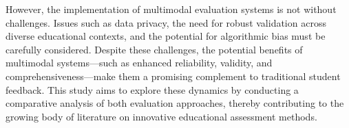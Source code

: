 However, the implementation of multimodal evaluation systems is not without challenges. Issues such as data privacy, the need for robust validation across diverse educational contexts, and the potential for algorithmic bias must be carefully considered. Despite these challenges, the potential benefits of multimodal systems—such as enhanced reliability, validity, and comprehensiveness—make them a promising complement to traditional student feedback. This study aims to explore these dynamics by conducting a comparative analysis of both evaluation approaches, thereby contributing to the growing body of literature on innovative educational assessment methods.

